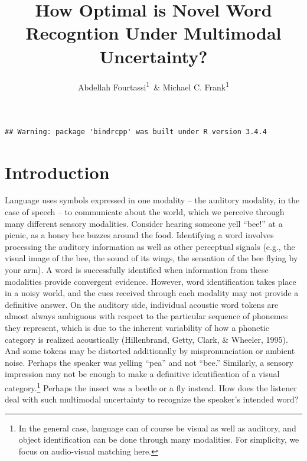 \documentclass[english,,man,floatsintext]{apa6}
\title{How Optimal is Novel Word Recogntion Under Multimodal Uncertainty?}
\author{Abdellah Fourtassi\textsuperscript{1}~\& Michael C.
Frank\textsuperscript{1}}
\date{}
\affiliation{
\vspace{0.5cm}
\textsuperscript{1} Department of Psychology, Stanford University}
\let\rmarkdownfootnote\footnote%
\def\footnote{\protect\rmarkdownfootnote}
\theoremstyle{definition}
\theoremstyle{definition}
\theoremstyle{definition}
\theoremstyle{remark}
\begin{document}
\maketitle

\begin{verbatim}
## Warning: package 'bindrcpp' was built under R version 3.4.4
\end{verbatim}

\section{Introduction}\label{introduction}

Language uses symbols expressed in one modality -- the auditory
modality, in the case of speech -- to communicate about the world, which
we perceive through many different sensory modalities. Consider hearing
someone yell \enquote{bee!} at a picnic, as a honey bee buzzes around
the food. Identifying a word involves processing the auditory
information as well as other perceptual signals (e.g., the visual image
of the bee, the sound of its wings, the sensation of the bee flying by
your arm). A word is successfully identified when information from these
modalities provide convergent evidence. However, word identification
takes place in a noisy world, and the cues received through each
modality may not provide a definitive answer. On the auditory side,
individual acoustic word tokens are almost always ambiguous with respect
to the particular sequence of phonemes they represent, which is due to
the inherent variability of how a phonetic category is realized
acoustically (Hillenbrand, Getty, Clark, \& Wheeler, 1995). And some
tokens may be distorted additionally by mispronunciation or ambient
noise. Perhaps the speaker was yelling \enquote{pea} and not
\enquote{bee.} Similarly, a sensory impression may not be enough to make
a definitive identification of a visual
category.\footnote{In the general case, language can of course be visual as well as auditory, and object identification can be done through many modalities. For simplicity, we focus on audio-visual matching here.}
Perhaps the insect was a beetle or a fly instead. How does the listener
deal with such multimodal uncertainty to recognize the speaker's
intended word?
\end{document}
